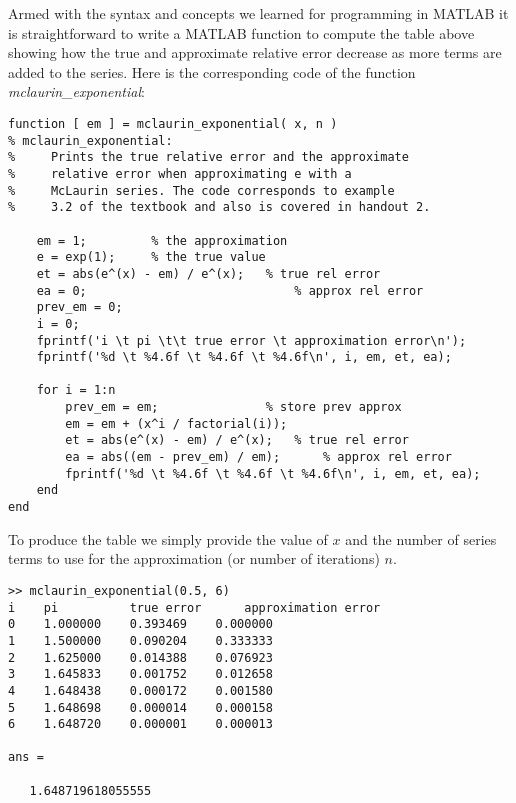 \documentclass [titlepage,12pt,letter] {article}
\begin{document}
Armed with the syntax and concepts we learned for programming in
MATLAB it is straightforward to write a MATLAB function to compute 
the table above showing how the true and approximate relative error 
decrease as more terms are added to the series. Here is the
corresponding code of the function {\it mclaurin\_exponential}: 

\begin{verbatim} 
function [ em ] = mclaurin_exponential( x, n )
% mclaurin_exponential:
%     Prints the true relative error and the approximate
%     relative error when approximating e with a 
%     McLaurin series. The code corresponds to example
%     3.2 of the textbook and also is covered in handout 2.

    em = 1;         % the approximation
    e = exp(1);     % the true value
    et = abs(e^(x) - em) / e^(x);   % true rel error
    ea = 0;                             % approx rel error
    prev_em = 0;
    i = 0;
    fprintf('i \t pi \t\t true error \t approximation error\n');
    fprintf('%d \t %4.6f \t %4.6f \t %4.6f\n', i, em, et, ea);
    
    for i = 1:n
        prev_em = em;               % store prev approx
        em = em + (x^i / factorial(i));
        et = abs(e^(x) - em) / e^(x);   % true rel error
        ea = abs((em - prev_em) / em);      % approx rel error
        fprintf('%d \t %4.6f \t %4.6f \t %4.6f\n', i, em, et, ea);
    end
end
\end{verbatim} 


To produce the table we simply provide the value of $x$ and the number
of series terms to use for the approximation (or number of iterations)
$n$. 

\begin{verbatim} 
>> mclaurin_exponential(0.5, 6)
i 	 pi 		 true error 	 approximation error
0 	 1.000000 	 0.393469 	 0.000000
1 	 1.500000 	 0.090204 	 0.333333
2 	 1.625000 	 0.014388 	 0.076923
3 	 1.645833 	 0.001752 	 0.012658
4 	 1.648438 	 0.000172 	 0.001580
5 	 1.648698 	 0.000014 	 0.000158
6 	 1.648720 	 0.000001 	 0.000013

ans =

   1.648719618055555
\end{verbatim} 


 
 
\end{document}
